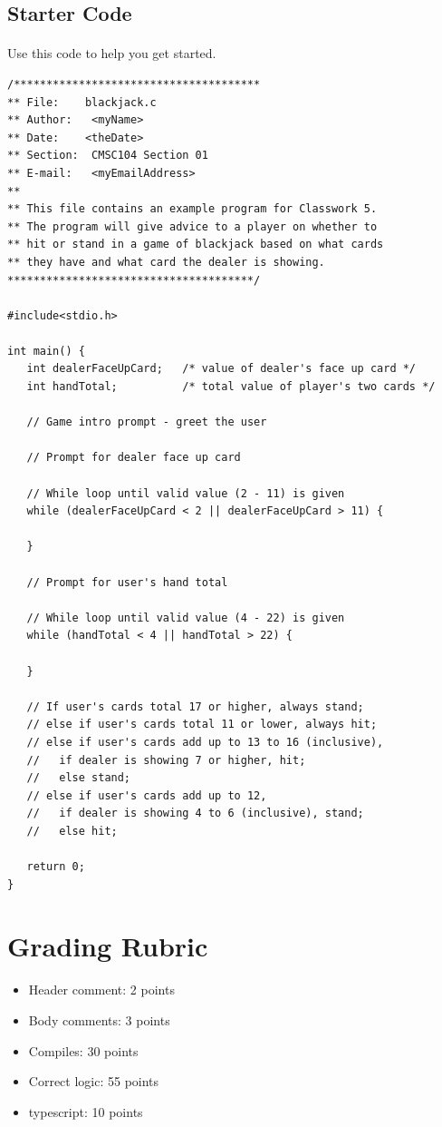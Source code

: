 \documentclass[letter,11pt]{article}
\begin{document}
\subsection*{Starter Code}
\paragraph{}Use this code to help you get started.
\begin{verbatim}
/**************************************
** File:    blackjack.c
** Author:   <myName>
** Date:    <theDate>
** Section:  CMSC104 Section 01
** E-mail:   <myEmailAddress>
**
** This file contains an example program for Classwork 5.
** The program will give advice to a player on whether to
** hit or stand in a game of blackjack based on what cards
** they have and what card the dealer is showing.
**************************************/

#include<stdio.h>

int main() {
   int dealerFaceUpCard;   /* value of dealer's face up card */
   int handTotal;          /* total value of player's two cards */

   // Game intro prompt - greet the user

   // Prompt for dealer face up card
   
   // While loop until valid value (2 - 11) is given
   while (dealerFaceUpCard < 2 || dealerFaceUpCard > 11) {
      
   }

   // Prompt for user's hand total
   
   // While loop until valid value (4 - 22) is given
   while (handTotal < 4 || handTotal > 22) {
      
   }

   // If user's cards total 17 or higher, always stand;
   // else if user's cards total 11 or lower, always hit;
   // else if user's cards add up to 13 to 16 (inclusive),
   //   if dealer is showing 7 or higher, hit;
   //   else stand;
   // else if user's cards add up to 12,
   //   if dealer is showing 4 to 6 (inclusive), stand;
   //   else hit;

   return 0;
}
\end{verbatim}

\section*{Grading Rubric}
\begin{itemize}
    \item Header comment: 2 points
    \item Body comments: 3 points
    \item Compiles: 30 points
    \item Correct logic: 55 points
    \item typescript: 10 points
\end{itemize}
\end{document}
